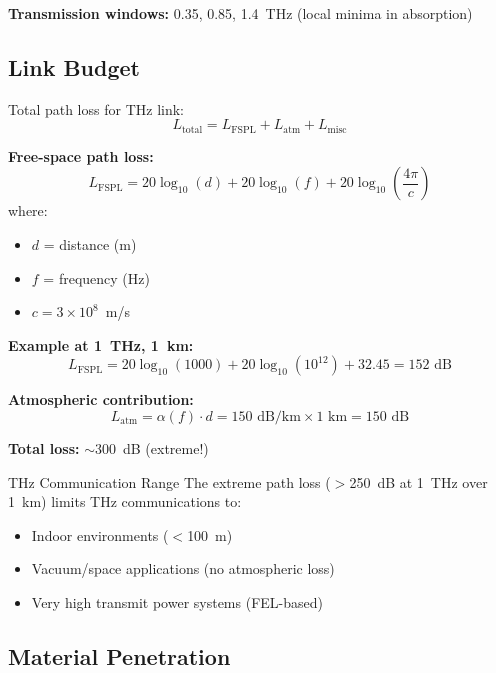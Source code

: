 \textbf{Transmission windows:} 0.35, 0.85, 1.4~THz (local minima in absorption)

\subsection{Link Budget}

Total path loss for THz link:
\begin{equation}
L_{\text{total}} = L_{\text{FSPL}} + L_{\text{atm}} + L_{\text{misc}}
\end{equation}

\textbf{Free-space path loss:}
\begin{equation}
L_{\text{FSPL}} = 20\log_{10}(d) + 20\log_{10}(f) + 20\log_{10}\left(\frac{4\pi}{c}\right)
\end{equation}
where:
\begin{itemize}
\item $d$ = distance (m)
\item $f$ = frequency (Hz)
\item $c = 3 \times 10^8$~m/s
\end{itemize}

\textbf{Example at 1~THz, 1~km:}
\begin{equation}
L_{\text{FSPL}} = 20\log_{10}(1000) + 20\log_{10}(10^{12}) + 32.45 = 152 \text{ dB}
\end{equation}

\textbf{Atmospheric contribution:}
\begin{equation}
L_{\text{atm}} = \alpha(f) \cdot d = 150 \text{ dB/km} \times 1 \text{ km} = 150 \text{ dB}
\end{equation}

\textbf{Total loss:} $\sim$300~dB (extreme!)

\begin{calloutbox}{THz Communication Range}
The extreme path loss ($>$250~dB at 1~THz over 1~km) limits THz communications to:
\begin{itemize}
\item Indoor environments ($<$100~m)
\item Vacuum/space applications (no atmospheric loss)
\item Very high transmit power systems (FEL-based)
\end{itemize}
\end{calloutbox}

\subsection{Material Penetration}

